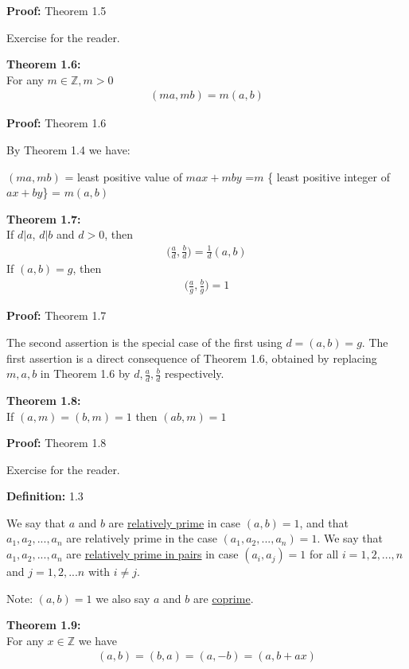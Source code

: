 \documentclass[a4paper]{article}
\begin{document}
\textbf{Proof:} Theorem 1.5

Exercise for the reader.



\textbf{Theorem 1.6:}\\
For any $m\in\mathbb{Z}, m>0$
\begin{align}
    (ma,mb)=m(a,b)
\end{align}

\textbf{Proof:} Theorem 1.6

By Theorem 1.4 we have:

$(ma,mb)$ = least positive value of $max+mby$
=$m$ \{ least positive integer of $ax+by$\}
= $m(a,b)$


\textbf{Theorem 1.7:}\\
If $d|a$, $d|b$ and $d>0$, then
\begin{align}
    \bigg(\frac{a}{d},\frac{b}{d}\bigg)=\frac{1}{d}(a,b)
\end{align}
If $(a,b)=g$, then
\begin{align}
    \bigg(\frac{a}{g},\frac{b}{g}\bigg)=1
\end{align}



\textbf{Proof:} Theorem 1.7

The second assertion is the special case of the first using $d=(a,b)=g$.
The first assertion is a direct consequence of Theorem 1.6, obtained by
replacing $m,a,b$ in Theorem 1.6 by $d,\frac{a}{d},\frac{b}{d}$ respectively.

\textbf{Theorem 1.8:}\\
If $(a,m)=(b,m)=1$ then $(ab,m)=1$

\textbf{Proof:} Theorem 1.8

Exercise for the reader.

\textbf{Definition:} 1.3

We say that $a$ and $b$ are \underline{relatively prime} in case $(a,b)=1$,
and that $a_1,a_2,...,a_n$ are relatively prime in the case $(a_1,a_2,...,a_n)=1$.
We say that $a_1,a_2,...,a_n$ are \underline{relatively prime in pairs} in
case $(a_i,a_j)=1$ for all $i=1,2,...,n$ and $j=1,2,...n$ with $i \neq j$.

Note: $(a,b)=1$ we also say $a$ and $b$ are \underline{coprime}.

\textbf{Theorem 1.9:}\\
For any $x\in\mathbb{Z}$ we have
\begin{align}
(a,b)=(b,a)=(a,-b)=(a,b+ax)
\end{align}
\end{document}

